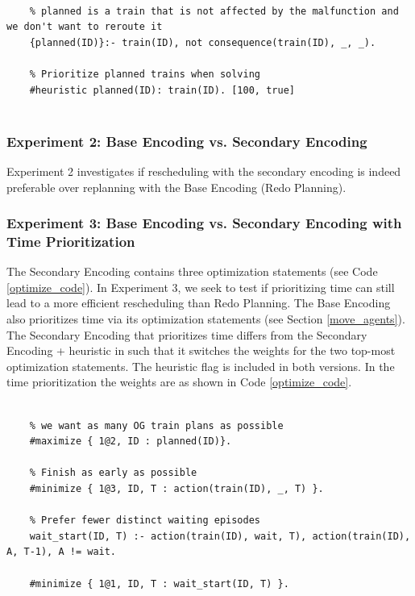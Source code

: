 \documentclass[runningheads]{llncs}
\begin{document}
\begin{lstlisting}[style=mystyle, language=Clingo, caption={The heuristic flag in line 6 prioritizes solutions with planned trains.}, label=heuristic_code]
	
	% planned is a train that is not affected by the malfunction and we don't want to reroute it
	{planned(ID)}:- train(ID), not consequence(train(ID), _, _).
	
	% Prioritize planned trains when solving
	#heuristic planned(ID): train(ID). [100, true]
	
\end{lstlisting}

\subsubsection{Experiment 2: Base Encoding vs. Secondary Encoding}
Experiment 2 investigates if rescheduling with the secondary encoding is indeed preferable over replanning with the Base Encoding (Redo Planning).


\subsubsection{Experiment 3: Base Encoding vs. Secondary Encoding with Time Prioritization}
The Secondary Encoding contains three optimization statements (see Code \ref{optimize_code}). In Experiment 3, we seek to test if prioritizing time can still lead to a more efficient rescheduling than Redo Planning. The Base Encoding also prioritizes time via its optimization statements (see Section \ref{move_agents}). The Secondary Encoding that prioritizes time differs from the Secondary Encoding + heuristic in such that it switches the weights for the two top-most optimization statements. The heuristic flag is included in both versions. In the time prioritization the weights are as shown in Code \ref{optimize_code}. 

\begin{lstlisting}[style=mystyle, language=Clingo, caption={Optimization statements in Secondary Encoding + time prioritization.}, label=optimize_code]
	
	% we want as many OG train plans as possible
	#maximize { 1@2, ID : planned(ID)}.

	% Finish as early as possible
	#minimize { 1@3, ID, T : action(train(ID), _, T) }.

	% Prefer fewer distinct waiting episodes
	wait_start(ID, T) :- action(train(ID), wait, T), action(train(ID), A, T-1), A != wait.

	#minimize { 1@1, ID, T : wait_start(ID, T) }.
	
\end{lstlisting}
\end{document}
